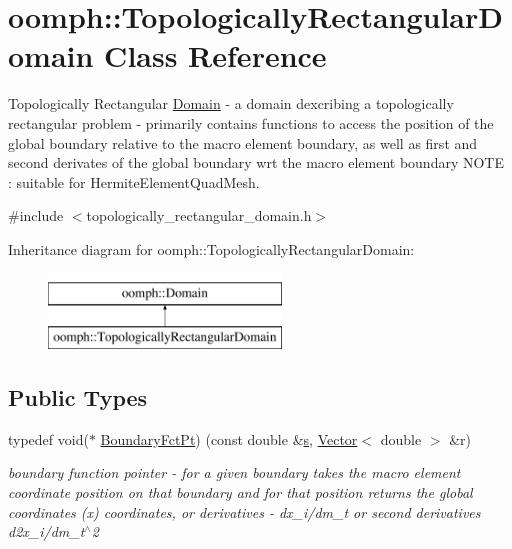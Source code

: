 \hypertarget{classoomph_1_1TopologicallyRectangularDomain}{}\section{oomph\+:\+:Topologically\+Rectangular\+Domain Class Reference}
\label{classoomph_1_1TopologicallyRectangularDomain}


Topologically Rectangular \hyperlink{classoomph_1_1Domain}{Domain} -\/ a domain dexcribing a topologically rectangular problem -\/ primarily contains functions to access the position of the global boundary relative to the macro element boundary, as well as first and second derivates of the global boundary wrt the macro element boundary N\+O\+TE \+: suitable for Hermite\+Element\+Quad\+Mesh.  




{\ttfamily \#include $<$topologically\+\_\+rectangular\+\_\+domain.\+h$>$}

Inheritance diagram for oomph\+:\+:Topologically\+Rectangular\+Domain\+:\begin{figure}[H]
\begin{center}
\leavevmode
\includegraphics[height=2.000000cm]{classoomph_1_1TopologicallyRectangularDomain}
\end{center}
\end{figure}
\subsection*{Public Types}
\begin{DoxyCompactItemize}
\item 
typedef void($\ast$ \hyperlink{classoomph_1_1TopologicallyRectangularDomain_a8b2e24f5500d86c93aef509c5410e7cc}{Boundary\+Fct\+Pt}) (const double \&\hyperlink{cfortran_8h_ab7123126e4885ef647dd9c6e3807a21c}{s}, \hyperlink{classoomph_1_1Vector}{Vector}$<$ double $>$ \&r)
\begin{DoxyCompactList}\small\item\em boundary function pointer -\/ for a given boundary takes the macro element coordinate position on that boundary and for that position returns the global coordinates (x) coordinates, or derivatives -\/ dx\+\_\+i/dm\+\_\+t or second derivatives d2x\+\_\+i/dm\+\_\+t$^\wedge$2 \end{DoxyCompactList}\end{DoxyCompactItemize}
